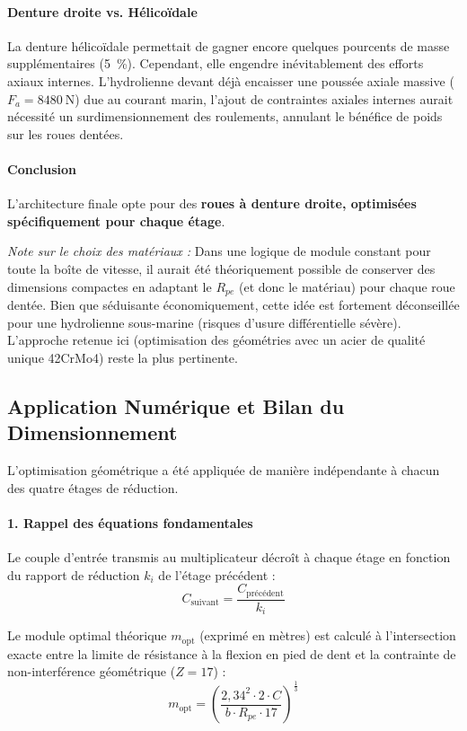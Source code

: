 \documentclass[11pt,a4paper]{article}
\begin{document}
\paragraph{Denture droite vs. Hélicoïdale}
La denture hélicoïdale permettait de gagner encore quelques pourcents de masse supplémentaires (\qty{5}{\percent}). Cependant, elle engendre inévitablement des efforts axiaux internes. L'hydrolienne devant déjà encaisser une poussée axiale massive ($F_a = \qty{8480}{\newton}$) due au courant marin, l'ajout de contraintes axiales internes aurait nécessité un surdimensionnement des roulements, annulant le bénéfice de poids sur les roues dentées. 

\paragraph{Conclusion} L'architecture finale opte pour des \textbf{roues à denture droite, optimisées spécifiquement pour chaque étage}.

\textit{Note sur le choix des matériaux :} Dans une logique de module constant pour toute la boîte de vitesse, il aurait été théoriquement possible de conserver des dimensions compactes en adaptant le $R_{pe}$ (et donc le matériau) pour chaque roue dentée. Bien que séduisante économiquement, cette idée est fortement déconseillée pour une hydrolienne sous-marine (risques d'usure différentielle sévère). L'approche retenue ici (optimisation des géométries avec un acier de qualité unique 42CrMo4) reste la plus pertinente.

\subsection{Application Numérique et Bilan du Dimensionnement}

L'optimisation géométrique a été appliquée de manière indépendante à chacun des quatre étages de réduction.

\paragraph{1. Rappel des équations fondamentales}
Le couple d'entrée transmis au multiplicateur décroît à chaque étage en fonction du rapport de réduction $k_i$ de l'étage précédent :
\begin{equation}
    C_{\text{suivant}} = \frac{C_{\text{précédent}}}{k_i}
\end{equation}

Le module optimal théorique $m_{\text{opt}}$ (exprimé en mètres) est calculé à l'intersection exacte entre la limite de résistance à la flexion en pied de dent et la contrainte de non-interférence géométrique ($Z = 17$) :
\begin{equation}
    m_{\text{opt}} = \left( \frac{2{,}34^2 \cdot 2 \cdot C}{b \cdot R_{pe} \cdot 17} \right)^{\frac{1}{3}}
\end{equation}
\end{document}
